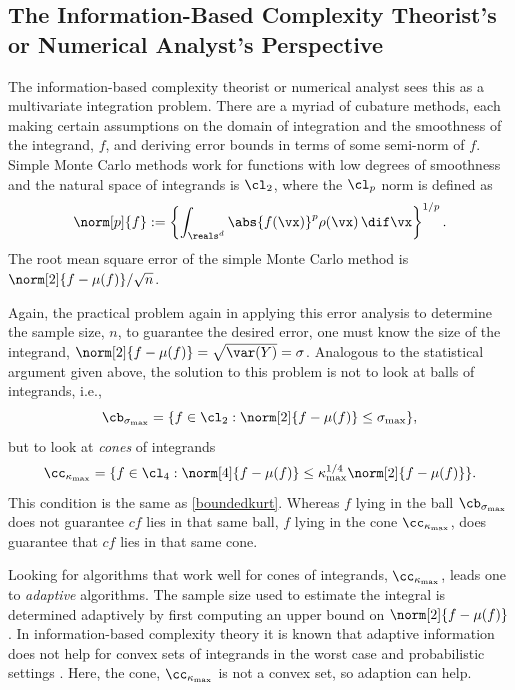 \documentclass[graybox]{svmult}
\begin{document}
\subsection{The Information-Based Complexity Theorist's or Numerical Analyst's Perspective} 
The information-based complexity theorist or numerical analyst sees this as a multivariate integration problem.  There are a myriad of cubature methods, each making certain assumptions on the domain of integration and the smoothness of the integrand, $f$, and deriving error bounds in terms of some semi-norm of $f$. Simple Monte Carlo methods work for functions with low degrees of smoothness and the natural space of integrands is $\cl_2$, where the $\cl_{p}$ norm is defined as
\begin{equation} \label{Lpnormdef}
\norm[p]{f} :=\left\{\int_{\reals^d} \abs{f(\vx)}^p \rho(\vx) \, \dif \vx\right\}^{1/p}.
\end{equation}
The root mean square error of the simple Monte Carlo method is $\norm[2]{f-\mu(f)}/\sqrt{n}$.

Again, the practical problem again in applying this error analysis to determine the sample size, $n$, to guarantee the desired error, one must know the size of the integrand, $\norm[2]{f-\mu(f)}=\sqrt{\var(Y)}=\sigma$.  Analogous to the statistical argument given above, the solution to this problem is not to look at balls of integrands, i.e., 
\begin{equation} \label{ballintegdef}
\cb_{\sigma_{\max}} = \{ f \in \cl_2 : \norm[2]{f-\mu(f)} \le \sigma_{\max}\}, 
\end{equation}
but to look at \emph{cones} of integrands 
\begin{equation}\label{coneintegdef}
\cc_{\kappa_{\max}} = \{f \in \cl_4 : \norm[4]{f-\mu(f)} \le \kappa_{\max}^{1/4} \norm[2]{f-\mu(f)} \}.
\end{equation}
This condition is the same as \eqref{boundedkurt}.  Whereas $f$ lying in the ball  $\cb_{\sigma_{\max}}$ does not guarantee $cf$ lies in that same ball, $f$ lying in the cone $\cc_{\kappa_{\max}}$, does guarantee that $cf$ lies in that same cone.

Looking for algorithms that work well for cones of integrands, $\cc_{\kappa_{\max}}$, leads one to \emph{adaptive} algorithms.  The sample size used to estimate the integral is determined adaptively by first computing an upper bound on $\norm[2]{f-\mu(f)}$.  In information-based complexity theory it is known that adaptive information does not help for convex sets of integrands in the worst case and probabilistic settings \citep[Chapter 4, Theorem 5.2.1; Chapter 8, Corollary 5.3.1]{TraWasWoz88}.  Here, the cone, $\cc_{\kappa_{\max}}$ is not a convex set, so adaption can help.
\end{document}
